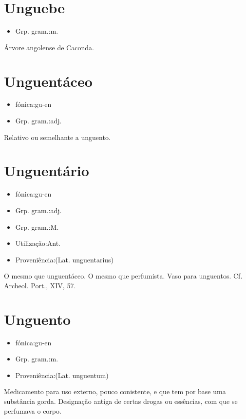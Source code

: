 \documentclass{article}
\begin{document}
\section{Unguebe}
\begin{itemize}
\item {Grp. gram.:m.}
\end{itemize}
Árvore angolense de Caconda.
\section{Unguentáceo}
\begin{itemize}
\item {fónica:gu-en}
\end{itemize}
\begin{itemize}
\item {Grp. gram.:adj.}
\end{itemize}
Relativo ou semelhante a unguento.
\section{Unguentário}
\begin{itemize}
\item {fónica:gu-en}
\end{itemize}
\begin{itemize}
\item {Grp. gram.:adj.}
\end{itemize}
\begin{itemize}
\item {Grp. gram.:M.}
\end{itemize}
\begin{itemize}
\item {Utilização:Ant.}
\end{itemize}
\begin{itemize}
\item {Proveniência:(Lat. \textunderscore unguentarius\textunderscore )}
\end{itemize}
O mesmo que \textunderscore unguentáceo\textunderscore .
O mesmo que \textunderscore perfumista\textunderscore .
Vaso para unguentos. Cf. \textunderscore Archeol. Port.\textunderscore , XIV, 57.
\section{Unguento}
\begin{itemize}
\item {fónica:gu-en}
\end{itemize}
\begin{itemize}
\item {Grp. gram.:m.}
\end{itemize}
\begin{itemize}
\item {Proveniência:(Lat. \textunderscore unguentum\textunderscore )}
\end{itemize}
Medicamento para uso externo, pouco conistente, e que tem por base uma substância gorda.
Designação antiga de certas drogas ou essências, com que se perfumava o corpo.
\end{document}
